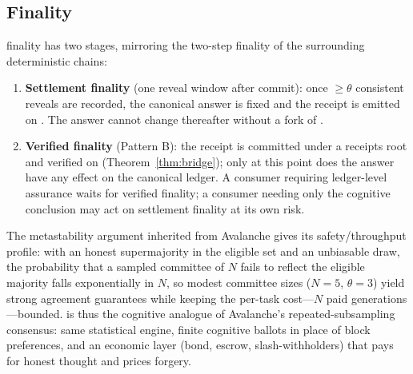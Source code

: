 \subsection{Finality}

\SCC{} finality has two stages, mirroring the two-step finality of the surrounding deterministic chains:

\begin{enumerate}[leftmargin=2.2em]
\item \textbf{Settlement finality} (one reveal window after commit): once $\ge \theta$ consistent reveals are recorded, the canonical answer is fixed and the \PoT{} receipt is emitted on \AChain{}. The answer cannot change thereafter without a fork of \AChain{}.
\item \textbf{Verified finality} (Pattern B): the receipt is committed under a receipts root and verified on \CChain{} (Theorem~\ref{thm:bridge}); only at this point does the answer have any effect on the canonical ledger. A consumer requiring ledger-level assurance waits for verified finality; a consumer needing only the cognitive conclusion may act on settlement finality at its own risk.
\end{enumerate}

The metastability argument inherited from Avalanche gives \SCC{} its safety/throughput profile: with an honest supermajority in the eligible set and an unbiasable draw, the probability that a sampled committee of $N$ fails to reflect the eligible majority falls exponentially in $N$, so modest committee sizes ($N{=}5$, $\theta{=}3$) yield strong agreement guarantees while keeping the per-task cost---$N$ paid generations---bounded. \SCC{} is thus the cognitive analogue of Avalanche's repeated-subsampling consensus: same statistical engine, finite cognitive ballots in place of block preferences, and an economic layer (bond, escrow, slash-withholders) that pays for honest thought and prices forgery.

